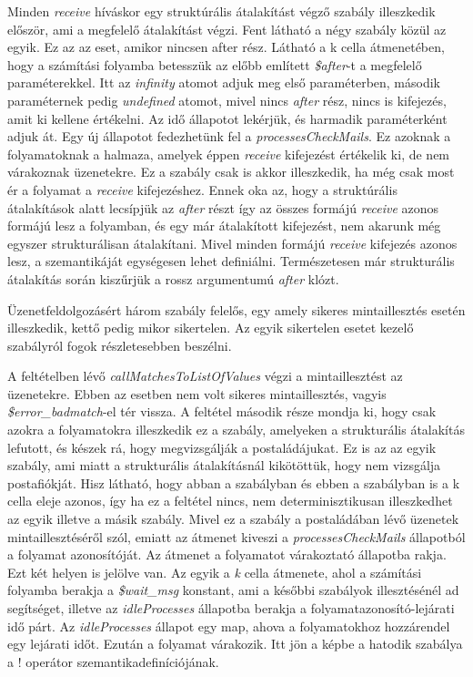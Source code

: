 Minden \textit{receive} híváskor egy struktúrális átalakítást végző szabály illeszkedik először, ami a megfelelő átalakítást végzi. Fent látható a négy szabály közül az egyik. Ez az az eset, amikor nincsen after rész. Látható a k cella átmenetében, hogy a számítási folyamba betesszük az előbb említett \textit{\$after}-t a megfelelő paraméterekkel. Itt az \textit{infinity} atomot adjuk meg első paraméterben, második paraméternek pedig \textit{undefined} atomot, mivel nincs \textit{after} rész, nincs is kifejezés, amit ki kellene értékelni. Az idő állapotot lekérjük, és harmadik paraméterként adjuk át. Egy új állapotot fedezhetünk fel a \textit{processesCheckMails}. Ez azoknak a folyamatoknak a halmaza, amelyek éppen \textit{receive} kifejezést értékelik ki, de nem várakoznak üzenetekre. Ez a szabály csak is akkor illeszkedik, ha még csak most ér a folyamat a \textit{receive} kifejezéshez. Ennek oka az, hogy a struktúrális átalakítások alatt lecsípjük az \textit{after} részt így az összes formájú \textit{receive} azonos formájú lesz a folyamban, és egy már átalakított kifejezést, nem akarunk még egyszer strukturálisan átalakítani. Mivel minden formájú \textit{receive} kifejezés azonos lesz, a szemantikáját egységesen lehet definiálni. Természetesen már strukturális átalakítás során kiszűrjük a rossz argumentumú \textit{after} klózt.

Üzenetfeldolgozásért három szabály felelős, egy amely sikeres mintaillesztés esetén illeszkedik, kettő pedig mikor sikertelen. Az egyik sikertelen esetet kezelő szabályról fogok részletesebben beszélni.



A feltételben lévő \textit{callMatchesToListOfValues} végzi a mintaillesztést az üzenetekre. Ebben az esetben nem volt sikeres mintaillesztés, vagyis \textit{\$error\_badmatch}-el tér vissza. A feltétel második része mondja ki, hogy csak azokra a folyamatokra illeszkedik ez a szabály, amelyeken a strukturális átalakítás lefutott, és készek rá, hogy megvizsgálják a postaládájukat. Ez is az az egyik szabály, ami miatt a strukturális átalakításnál kikötöttük, hogy nem vizsgálja postafiókját. Hisz látható, hogy abban a szabályban és ebben a szabályban is a k cella eleje azonos, így ha ez a feltétel nincs, nem determinisztikusan illeszkedhet az egyik illetve a másik szabály. Mivel ez a szabály a postaládában lévő üzenetek mintaillesztéséről szól, emiatt az átmenet kiveszi a \textit{processesCheckMails} állapotból a folyamat azonosítóját. Az átmenet a folyamatot várakoztató állapotba rakja. Ezt két helyen is jelölve van. Az egyik a \textit{k} cella átmenete, ahol a számítási folyamba berakja a \textit{\$wait\_msg} konstant, ami a későbbi szabályok illesztésénél ad segítséget, illetve az \textit{idleProcesses} állapotba berakja a folyamatazonosító-lejárati idő párt. Az \textit{idleProcesses} állapot egy map, ahova a folyamatokhoz hozzárendel egy lejárati időt. Ezután a folyamat várakozik. Itt jön a képbe a hatodik szabálya a ! operátor szemantikadefiníciójának.

